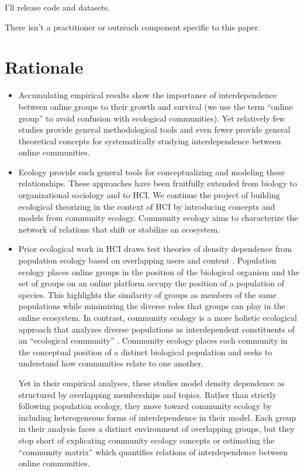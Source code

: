 \documentclass[12pt]{memoir}
\begin{document}
I'll release code and datasets.

There isn't a practitioner or outreach component specific to this paper. 

\section{Rationale}

\begin{itemize}
\item Accumulating empirical results show the importance of interdependence between online groups to their growth and survival (we use the term ``online group'' to avoid confusion with ecological communities).  Yet relatively few studies provide general methodological tools and even fewer provide general theoretical concepts for systematically studying interdependence between online communities. 

\item Ecology provide such general tools for conceptualizing and modeling these relationships.  These approaches have been fruitfully extended from biology to organizational sociology and to HCI.  We continue the project of building ecological theorizing in the context of HCI by introducing concepts and models from community ecology.  Community ecology aims to characterize the network of relations that shift or stabilize an ecosystem.  

\item Prior ecological work in HCI draws test theories of density dependence from population ecology based on overlapping users and content \citep{zhu_impact_2014,zhu_selecting_2014,wang_impact_2013}.  Population ecology places online groups in the position of the biological organism and the set of groups on an online platform occupy the position of a population of species.  This highlights the similarity of groups as members of the same populations while minimizing the diverse roles that groups can play in the online ecosystem.   In contrast, community ecology is a more holistic ecological approach that analyzes diverse populations as interdependent constituents of an ``ecological community'' \citep{astley_two_1985-1}.  Community ecology places each community in the conceptual position of a distinct biological population and seeks to understand how communities relate to one another.  

Yet in their empirical analyses, these studies model density dependence as structured by overlapping memberships and topics.  Rather than strictly following population ecology, they move toward community ecology by including heterogeneous forms of interdependence in their model. Each group in their analysis faces a distinct environment of overlapping groups, but they stop short of explicating community ecology concepts or estimating the ``community matrix'' which quantifies relations of interdependence between online communities. 


\end{itemize}
\end{document}
